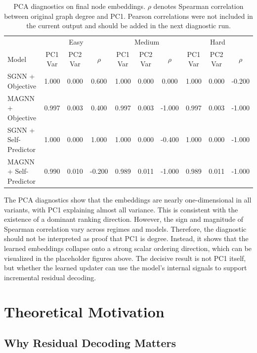 \begin{table}[t]
  \centering
  \small
  \begin{tabular}{l|ccc|ccc|ccc}
    \toprule
    & \multicolumn{3}{c|}{Easy} & \multicolumn{3}{c|}{Medium} & \multicolumn{3}{c}{Hard} \\
    Model & PC1 Var & PC2 Var & $\rho$ & PC1 Var & PC2 Var & $\rho$ & PC1 Var & PC2 Var & $\rho$ \\
    \midrule
    SGNN + Objective & 1.000 & 0.000 & 0.600 & 1.000 & 0.000 & 0.000 & 1.000 & 0.000 & -0.200 \\
    MAGNN + Objective & 0.997 & 0.003 & 0.400 & 0.997 & 0.003 & -1.000 & 0.997 & 0.003 & -1.000 \\
    SGNN + Self-Predictor & 1.000 & 0.000 & 1.000 & 1.000 & 0.000 & -0.400 & 1.000 & 0.000 & -1.000 \\
    MAGNN + Self-Predictor & 0.990 & 0.010 & -0.200 & 0.989 & 0.011 & -1.000 & 0.989 & 0.011 & -1.000 \\
    \bottomrule
  \end{tabular}
  \caption{PCA diagnostics on final node embeddings. $\rho$ denotes Spearman correlation between original graph degree and PC1. Pearson correlations were not included in the current output and should be added in the next diagnostic run.}
  \label{tab:pca-diagnostics}
\end{table}

The PCA diagnostics show that the embeddings are nearly one-dimensional in all variants, with PC1 explaining almost all variance. This is consistent with the existence of a dominant ranking direction. However, the sign and magnitude of Spearman correlation vary across regimes and models. Therefore, the diagnostic should not be interpreted as proof that PC1 is degree. Instead, it shows that the learned embeddings collapse onto a strong scalar ordering direction, which can be visualized in the placeholder figures above. The decisive result is not PC1 itself, but whether the learned updater can use the model's internal signals to support incremental residual decoding.

\section{Theoretical Motivation}

\subsection{Why Residual Decoding Matters}


